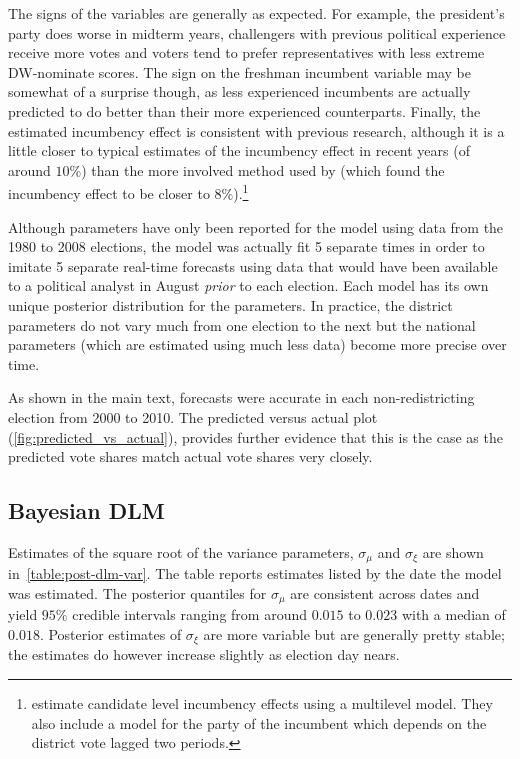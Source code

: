 \documentclass[12pt,final,fleqn]{article}
\theoremstyle{plain}
\begin{document}
The signs of the variables are generally as expected. For example, the president's party does worse in midterm years, challengers with previous political experience receive more votes and voters tend to prefer representatives with less extreme DW-nominate scores. The sign on the freshman incumbent variable may be somewhat of a surprise though, as less experienced incumbents are actually predicted to do better than their more experienced counterparts. Finally, the estimated incumbency effect is consistent with previous research, although it is a little closer to typical estimates of the incumbency effect in recent years (of around $10\%$) than the more involved method used by \citet{gelman2008estimating} (which found the incumbency effect to be closer to $8\%$).\footnote{\citet{gelman2008estimating} estimate candidate level incumbency effects using a multilevel model. They also include a model for the party of the incumbent which depends on the district vote lagged two periods.}

Although parameters have only been reported for the model using data from the 1980 to 2008 elections, the model was actually fit 5 separate times in order to imitate 5 separate real-time forecasts using data that would have been available to a political analyst in August \emph{prior} to each election. Each model has its own unique posterior distribution for the parameters. In practice, the district parameters do not vary much from one election to the next but the national parameters (which are estimated using much less data) become more precise over time. 

As shown in the main text, forecasts were accurate in each non-redistricting election from 2000 to 2010. The predicted versus actual plot (\autoref{fig:predicted_vs_actual}), provides further evidence that this is the case as the predicted vote shares match actual vote shares very closely. 

\subsection{Bayesian DLM}\label{sec:forecast_dlm}
Estimates of the square root of the variance parameters, $\sigma_\mu$ and $\sigma_\xi$ are shown in~\autoref{table:post-dlm-var}. The table reports estimates listed by the date the model was estimated. The posterior quantiles for $\sigma_\mu$ are consistent across dates and yield $95\%$ credible intervals ranging from around $0.015$ to  $0.023$ with a median of $0.018$. Posterior estimates of $\sigma_\xi$ are more variable but are generally pretty stable; the estimates do however increase slightly as election day nears.
\end{document}
